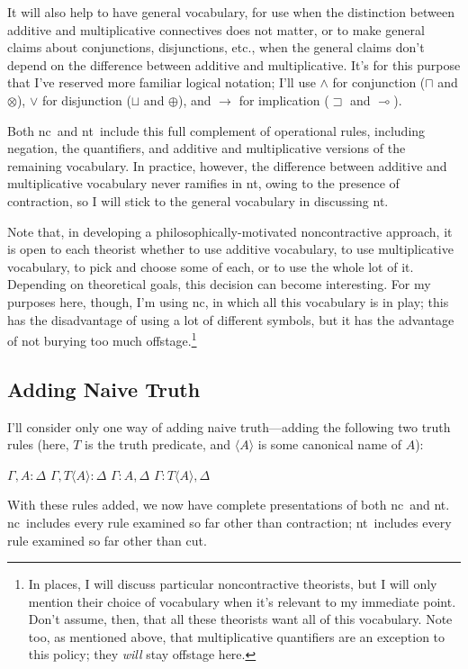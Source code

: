 \documentclass{ergoclass}
\def\fCenter{:}
\newcommand{\Tname}[1]{\T\name{#1}}
\newcommand{\name}[1]{\ensuremath{\langle #1 \rangle}}
\newcommand{\amcond}{\ensuremath{\rightarrow}}
\newcommand{\amor}{\vee}
\newcommand{\amand}{\ensuremath{\wedge}}
\newcommand{\mcond}{\ensuremath{\multimap}}
\newcommand{\mor}{\ensuremath{\oplus}}
\newcommand{\mand}{\ensuremath{\otimes}}
\newcommand{\acond}{\ensuremath{\sqsupset}}
\newcommand{\aor}{\ensuremath{\sqcup}}
\newcommand{\aand}{\ensuremath{\sqcap}}
\newcommand{\T}{\ensuremath{T}}
\newcommand{\hs}{\hskip 5mm}
\newcommand{\UIx}[2]{\UnaryInf$ #1 \fCenter #2$}
\newcommand{\AXx}[2]{\Axiom$ #1 \fCenter #2$}
\newcommand{\LLl}[1]{\LeftLabel{\scriptsize #1:\quad}}
\newcommand{\nclog}{{\sc nc}}
\newcommand{\ntlog}{{\sc nt}}
\begin{document}
It will also help to have general vocabulary, for use when the distinction between additive and multiplicative connectives does not matter, or to make general claims about conjunctions, disjunctions, etc., when the general claims don't depend on the difference between additive and multiplicative. It's for this purpose that I've reserved more familiar logical notation; I'll use $\amand$ for conjunction ($\aand$ and $\mand$), $\amor$ for disjunction ($\aor$ and $\mor$), and $\amcond$ for implication ($\acond$ and $\mcond$).

Both \nclog\ and \ntlog\ include this full complement of operational rules, including negation, the quantifiers, and additive and multiplicative versions of the remaining vocabulary. In practice, however, the difference between additive and multiplicative vocabulary never ramifies in \ntlog, owing to the presence of contraction, so I will stick to the general vocabulary in discussing \ntlog.

Note that, in developing a philosophically-motivated noncontractive approach, it is open to each theorist whether to use additive vocabulary, to use multiplicative vocabulary, to pick and choose some of each, or to use the whole lot of it. Depending on theoretical goals, this decision can become interesting. For my purposes here, though, I'm using \nclog, in which all this vocabulary is in play; this has the disadvantage of using a lot of different symbols, but it has the advantage of not burying too much offstage.\footnote{In places, I will discuss particular noncontractive theorists, but I will only mention their choice of vocabulary when it's relevant to my immediate point. Don't assume, then, that all these theorists want all of this vocabulary. Note too, as mentioned above, that multiplicative quantifiers are an exception to this policy; they {\em will} stay offstage here.}


\subsection{Adding Naive Truth} \label{naivetruth}

I'll consider only one way of adding naive truth---adding the following two truth rules (here, $\T$ is the truth predicate, and $\name{A}$ is some canonical name of $A$):

\begin{center}
\AXx{\Gamma, A}{\Delta}
\LLl{$\T$L}
\UIx{\Gamma, \Tname{A}}{\Delta}
\DP
\hs
\AXx{\Gamma}{A, \Delta}
\LLl{$\T$R}
\UIx{\Gamma}{\Tname{A}, \Delta}
\DP
\end{center}
With these rules added, we now have complete presentations of both \nclog\ and \ntlog. \nclog\ includes every rule examined so far other than contraction; \ntlog\ includes every rule examined so far other than cut.
\end{document}
